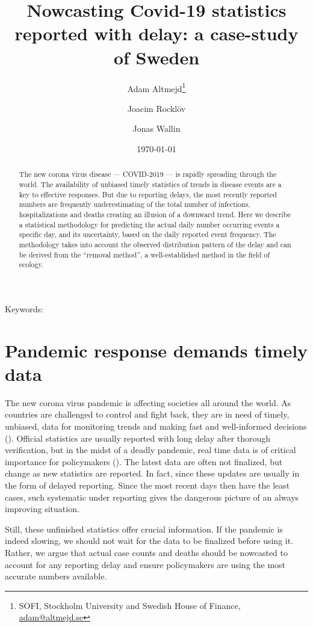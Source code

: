 \documentclass[a4paper,11pt,article,oneside,openany,american]{memoir}
\title{Nowcasting Covid-19 statistics reported with delay: a case-study of Sweden}
\date{\today}
\author{
	Adam Altmejd\thanks{SOFI, Stockholm University and Swedish House of Finance, \href{mailto:adam@altmejd.se}{adam@altmejd.se}} \and
	Joacim Rocklöv \and
	Jonas Wallin
}
\begin{document}
\frontmatter%
\begin{titlingpage}
    \maketitle
    \begin{abstract}
        The new corona virus disease --- COVID-2019 --- is rapidly spreading through the world. The availability of unbiased timely statistics of trends in disease events are a key to effective responses. But due to reporting delays, the most recently reported numbers are frequently underestimating of the total number of infections, hospitalizations and deaths creating an illusion of a downward trend. Here we describe a statistical methodology for predicting the actual daily number occurring events a specific day, and its uncertainty, based on the daily reported event frequency. The methodology takes into account the observed distribution pattern of the delay and can be derived from the ``removal method'', a well-established method in the field of ecology.
	\end{abstract}

	\noindent Keywords:

\end{titlingpage}
\mainmatter%

\chapter{Pandemic response demands timely data}
The new corona virus pandemic is affecting societies all around the world. As countries are challenged to control and fight back, they are in need of timely, unbiased, data for monitoring trends and making fast and well-informed decisions (\cite{No_author_2020_coronavirus_three}). Official statistics are usually reported with long delay after thorough verification, but in the midst of a deadly pandemic, real time data is of critical importance for policymakers (\cite{Jajosky2004_evaluation_reporting}). The latest data are often not finalized, but change as new statistics are reported. In fact, since these updates are usually in the form of delayed reporting. Since the most recent days then have the least cases, such systematic under reporting gives the dangerous picture of an always improving situation.

Still, these unfinished statistics offer crucial information. If the pandemic is indeed slowing, we should not wait for the data to be finalized before using it. Rather, we argue that actual case counts and deaths should be nowcasted to account for any reporting delay and ensure policymakers are using the most accurate numbers available.
\end{document}
